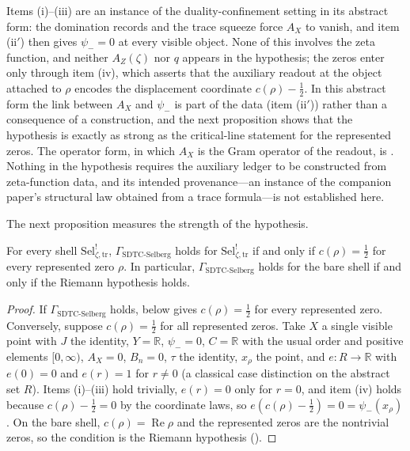 \documentclass[11pt]{article}
\DeclareMathOperator{\Real}{Re}
\newcommand{\AZ}{A_{Z}(\zeta)}
\newcommand{\Sel}{\mathrm{Sel}^{!}_{\zeta,\mathrm{tr}}}
\newcommand{\GamSDTCSelberg}{\Gamma_{\mathrm{SDTC\text{-}Selberg}}}
\newcommand{\psim}{\psi_{-}}
\newcommand{\AX}{A_{X}}
\theoremstyle{definition}
\begin{document}
Items (i)--(iii) are an instance of the duality-confinement setting in
its abstract form: the domination records and the trace squeeze force
\(\AX\) to vanish, and item (ii\('\)) then gives \(\psim=0\) at every visible
object.  None of this involves the zeta function, and neither \(\AZ\) nor \(q\)
appears in the hypothesis; the zeros enter only through item (iv), which asserts that the auxiliary readout at the
object attached to \(\rho\) encodes the displacement coordinate
\(c(\rho)-\frac12\).  In this abstract form the link between
\(\AX\) and \(\psim\) is part of the data (item (ii\('\))) rather than a
consequence of a construction, and the next proposition shows that the
hypothesis is exactly as strong as the critical-line statement for the
represented zeros.  The operator form, in which \(\AX\) is the Gram
operator of the readout, is .  Nothing in the
hypothesis requires the auxiliary ledger to be constructed from
zeta-function data, and its intended provenance---an instance of the
companion paper's structural law obtained from a trace formula---is
not established here.

The next proposition measures the strength of the hypothesis.

\begin{proposition}
\label{prop:rh:gamma-calibration}
For every shell \(\Sel\), \(\GamSDTCSelberg\) holds for \(\Sel\) if and
only if \(c(\rho)=\frac12\) for every represented zero
\(\rho\).  In particular, \(\GamSDTCSelberg\) holds for the bare shell if and only
if the Riemann hypothesis holds.
\end{proposition}

\begin{proof}
If \(\GamSDTCSelberg\) holds,  below gives
\(c(\rho)=\frac12\) for every represented zero.
Conversely, suppose \(c(\rho)=\frac12\) for all represented
zeros.  Take \(X\) a single visible point with \(J\) the identity,
\(Y=\mathbb R\), \(\psim=0\), \(C=\mathbb R\) with the usual order and positive elements
\([0,\infty)\),
\(\AX=0\), \(B_n=0\), \(\tau\) the identity, \(x_\rho\) the point, and \(e:R\to\mathbb R\) with \(e(0)=0\) and \(e(r)=1\) for \(r\neq0\)
(a classical case distinction on the abstract set \(R\)).  Items (i)--(iii) hold trivially, \(e(r)=0\) only for \(r=0\), and item (iv)
holds because \(c(\rho)-\frac12=0\) by the coordinate
laws, so \(e(c(\rho)-\frac12)=0=\psim(x_\rho)\).  On the
bare shell, \(c(\rho)=\Real\rho\) and the represented zeros
are the nontrivial zeros, so the condition is the Riemann hypothesis
().
\end{proof}
\end{document}
